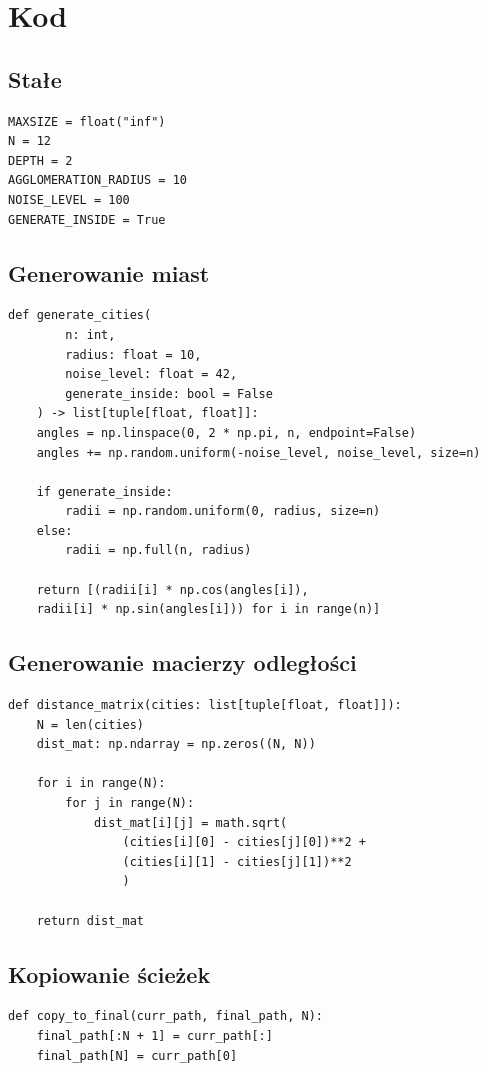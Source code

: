 \documentclass{article}
\begin{document}
\section{Kod}
\subsection{Stałe}
\begin{lstlisting}
MAXSIZE = float("inf")
N = 12
DEPTH = 2
AGGLOMERATION_RADIUS = 10
NOISE_LEVEL = 100
GENERATE_INSIDE = True
\end{lstlisting}

\subsection{Generowanie miast}
\begin{lstlisting}
def generate_cities(
        n: int, 
        radius: float = 10, 
        noise_level: float = 42, 
        generate_inside: bool = False
    ) -> list[tuple[float, float]]:
    angles = np.linspace(0, 2 * np.pi, n, endpoint=False)
    angles += np.random.uniform(-noise_level, noise_level, size=n)
    
    if generate_inside:
        radii = np.random.uniform(0, radius, size=n)
    else:
        radii = np.full(n, radius)

    return [(radii[i] * np.cos(angles[i]), 
    radii[i] * np.sin(angles[i])) for i in range(n)]
\end{lstlisting}

\subsection{Generowanie macierzy odległości}
\begin{lstlisting}
def distance_matrix(cities: list[tuple[float, float]]):
    N = len(cities)
    dist_mat: np.ndarray = np.zeros((N, N))

    for i in range(N):
        for j in range(N):
            dist_mat[i][j] = math.sqrt(
                (cities[i][0] - cities[j][0])**2 + 
                (cities[i][1] - cities[j][1])**2
                )

    return dist_mat
\end{lstlisting}

\subsection{Kopiowanie ścieżek}
\begin{lstlisting}
def copy_to_final(curr_path, final_path, N):
    final_path[:N + 1] = curr_path[:]
    final_path[N] = curr_path[0]
\end{lstlisting}
\end{document}
